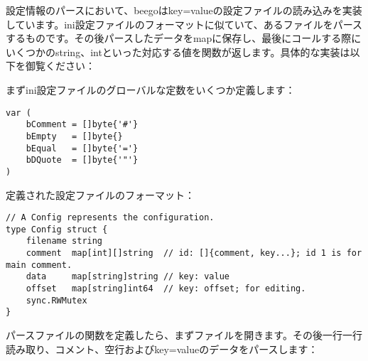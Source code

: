 設定情報のパースにおいて、beegoはkey=valueの設定ファイルの読み込みを実装しています。ini設定ファイルのフォーマットに似ていて、あるファイルをパースするものです。その後パースしたデータをmapに保存し、最後にコールする際にいくつかのstring、intといった対応する値を関数が返します。具体的な実装は以下を御覧ください：

まずini設定ファイルのグローバルな定数をいくつか定義します：

\begin{lstlisting}[numbers=none]
var (
    bComment = []byte{'#'}
    bEmpty   = []byte{}
    bEqual   = []byte{'='}
    bDQuote  = []byte{'"'}
)
\end{lstlisting}

定義された設定ファイルのフォーマット：


\begin{lstlisting}[numbers=none]
// A Config represents the configuration.
type Config struct {
    filename string
    comment  map[int][]string  // id: []{comment, key...}; id 1 is for main comment.
    data     map[string]string // key: value
    offset   map[string]int64  // key: offset; for editing.
    sync.RWMutex
}
\end{lstlisting}

パースファイルの関数を定義したら、まずファイルを開きます。その後一行一行読み取り、コメント、空行およびkey=valueのデータをパースします：

